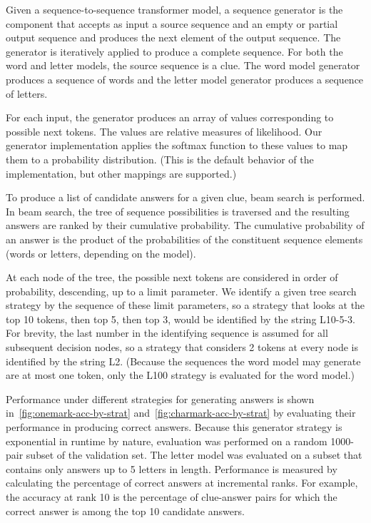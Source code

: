 \documentclass[letterpaper]{article} %
\begin{document}
\begin{NoHyper}
Given a sequence-to-sequence transformer model, a sequence generator is the component that accepts as input a source sequence and an empty or partial output sequence and produces the next element of the output sequence. The generator is iteratively applied to produce a complete sequence. For both the word and letter models, the source sequence is a clue. The word model generator produces a sequence of words and the letter model generator produces a sequence of letters.

For each input, the generator produces an array of values corresponding to possible next tokens. The values are relative measures of likelihood. Our generator implementation applies the softmax function to these values to map them to a probability distribution. (This is the default behavior of the implementation, but other mappings are supported.)

To produce a list of candidate answers for a given clue, beam search is performed. In beam search, the tree of sequence possibilities is traversed and the resulting answers are ranked by their cumulative probability. The cumulative probability of an answer is the product of the probabilities of the constituent sequence elements (words or letters, depending on the model).

At each node of the tree, the possible next tokens are considered in order of probability, descending, up to a limit parameter.
We identify a given tree search strategy by the sequence of these limit parameters, so a strategy that looks at the top 10 tokens, then top 5, then top 3, would be identified by the string L10-5-3.
For brevity, the last number in the identifying sequence is assumed for all subsequent decision nodes, so a strategy that considers 2 tokens at every node is identified by the string L2. (Because the sequences the word model may generate are at most one token, only the L100 strategy is evaluated for the word model.)

Performance under different strategies for generating answers is shown in~\ref{fig:onemark-acc-by-strat} and~\ref{fig:charmark-acc-by-strat} by evaluating their performance in producing correct answers.
Because this generator strategy is exponential in runtime by nature, evaluation was performed on a random 1000-pair subset of the validation set.
The letter model was evaluated on a subset that contains only answers up to 5 letters in length.
Performance is measured by calculating the percentage of correct answers at incremental ranks.
For example, the accuracy at rank 10 is the percentage of clue-answer pairs for which the correct answer is among the top 10 candidate answers.


\end{NoHyper}
\end{document}
